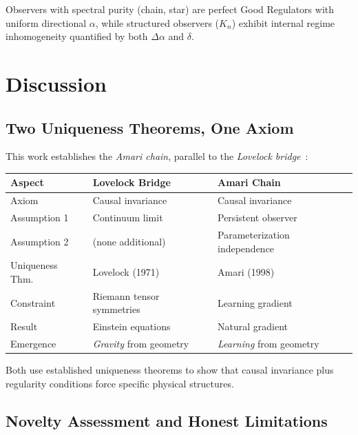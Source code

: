\documentclass[11pt,a4paper]{article}
\theoremstyle{plain}
\theoremstyle{definition}
\theoremstyle{remark}
\begin{document}
\noindent Observers with spectral purity (chain, star) are perfect Good Regulators with uniform directional $\alpha$, while structured observers ($K_n$) exhibit internal regime inhomogeneity quantified by both $\Delta\alpha$ and $\delta$.


\section{Discussion}
\label{sec:discussion}

\subsection{Two Uniqueness Theorems, One Axiom}

This work establishes the \emph{Amari chain}, parallel to the \emph{Lovelock bridge}~\cite{companion_lovelock}:

\begin{center}
\begin{tabular}{lll}
\hline
\textbf{Aspect} & \textbf{Lovelock Bridge} & \textbf{Amari Chain} \\
\hline
Axiom & Causal invariance & Causal invariance \\
Assumption 1 & Continuum limit & Persistent observer \\
Assumption 2 & (none additional) & Parameterization independence \\
Uniqueness Thm. & Lovelock (1971) & Amari (1998) \\
Constraint & Riemann tensor symmetries & Learning gradient \\
Result & Einstein equations & Natural gradient \\
Emergence & \emph{Gravity} from geometry & \emph{Learning} from geometry \\
\hline
\end{tabular}
\end{center}

Both use established uniqueness theorems to show that causal invariance plus regularity conditions force specific physical structures.

\subsection{Novelty Assessment and Honest Limitations}
\end{document}
